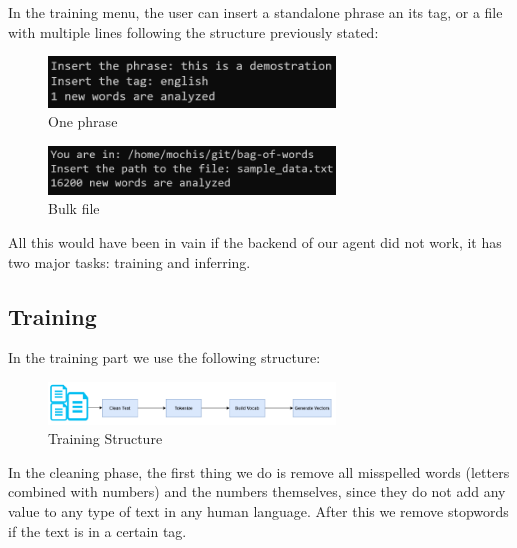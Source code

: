 \documentclass[sigconf,12pt,review=false,natbib=false]{acmart}
\begin{document}
In the training menu, the user can insert a standalone phrase an its tag, or a file with multiple lines following the
structure previously stated: \\

\begin{figure}[h!]
    \centering
    \includegraphics[width=3in]{one_phrase}
    \caption{One phrase}
    \label{fig:one_phrase}
\end{figure}

\begin{figure}[h!]
    \centering
    \includegraphics[width=3in]{bulk_file}
    \caption{Bulk file}
    \label{fig:bulk_file}
\end{figure}

All this would have been in vain if the backend of our agent did not work, it has two major tasks: training and inferring. \\

\subsection{Training}

In the training part we use the following structure: \\

\begin{figure}[h!]
    \centering
    \includegraphics[width=3in]{structure}
    \caption{Training Structure}
    \label{fig:bulk_file}
\end{figure}

In the cleaning phase, the first thing we do is remove all misspelled words (letters combined with numbers) and the numbers
themselves, since they do not add any value to any type of text in any human language. After this we remove stopwords if the
text is in a certain tag. \\
\end{document}
